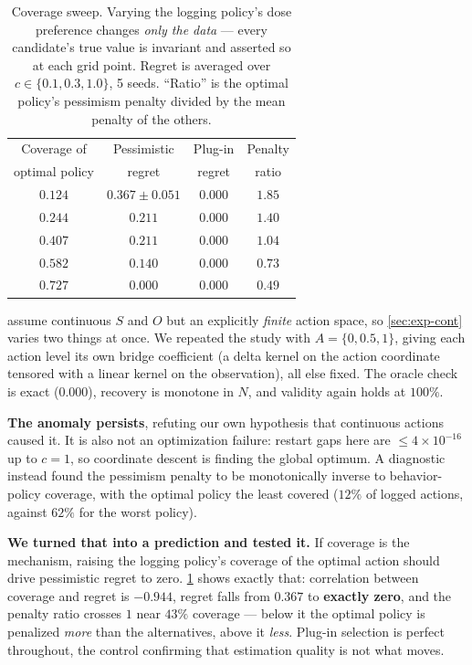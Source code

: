 \documentclass{article}
\theoremstyle{plain}
\theoremstyle{definition}
\begin{document}
\begin{table}[t]
\caption{Coverage sweep. Varying the logging policy's dose preference changes
\emph{only the data} --- every candidate's true value is invariant and asserted
so at each grid point. Regret is averaged over $c \in \{0.1, 0.3, 1.0\}$,
5 seeds. ``Ratio'' is the optimal policy's pessimism penalty divided by the mean
penalty of the others.}
\label{tab:coverage}
\vskip 0.1in
\begin{center}\small
\begin{tabular}{@{}cccc@{}}
\toprule
Coverage of & Pessimistic & Plug-in & Penalty \\
optimal policy & regret & regret & ratio \\
\midrule
$0.124$ & $0.367 \pm 0.051$ & $0.000$ & $1.85$ \\
$0.244$ & $0.211$ & $0.000$ & $1.40$ \\
$0.407$ & $0.211$ & $0.000$ & $1.04$ \\
$0.582$ & $0.140$ & $0.000$ & $0.73$ \\
$\mathbf{0.727}$ & $\mathbf{0.000}$ & $0.000$ & $\mathbf{0.49}$ \\
\bottomrule
\end{tabular}
\end{center}
\vskip -0.15in
\end{table}

\citet{hong2024} assume continuous $S$ and $O$ but an explicitly \emph{finite}
action space, so \cref{sec:exp-cont} varies two things at once. We repeated the
study with $A = \{0, 0.5, 1\}$, giving each action level its own bridge
coefficient (a delta kernel on the action coordinate tensored with a linear
kernel on the observation), all else fixed. The oracle check is exact ($0.000$),
recovery is monotone in $N$, and validity again holds at $100\%$.

\textbf{The anomaly persists}, refuting our own hypothesis that continuous
actions caused it. It is also not an optimization failure: restart gaps here are
$\le 4\times10^{-16}$ up to $c{=}1$, so coordinate descent is finding the global
optimum. A diagnostic instead found the pessimism penalty to be monotonically
inverse to behavior-policy coverage, with the optimal policy the least covered
($12\%$ of logged actions, against $62\%$ for the worst policy).

\textbf{We turned that into a prediction and tested it.} If coverage is the
mechanism, raising the logging policy's coverage of the optimal action should
drive pessimistic regret to zero. \cref{tab:coverage} shows exactly that:
correlation between coverage and regret is $-0.944$, regret falls from $0.367$ to
\textbf{exactly zero}, and the penalty ratio crosses $1$ near $43\%$ coverage ---
below it the optimal policy is penalized \emph{more} than the alternatives, above
it \emph{less}. Plug-in selection is perfect throughout, the control confirming
that estimation quality is not what moves.
\end{document}
